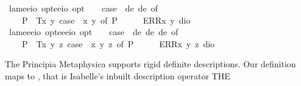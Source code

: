 \begin{isabellebody}
\isanewline
{}\isamarkupfalse%
\ lam{}{\isacharcolon}{\isacharcolon}{\isachardoublequoteopen}{\isacharparenleft}e{\isasymRightarrow}e{\isasymRightarrow}io\ opt{\isacharparenright}{\isasymRightarrow}{\isacharparenleft}e{\isasymRightarrow}e{\isasymRightarrow}io{\isacharparenright}\ opt{\isachardoublequoteclose}{\isacharparenleft}{\isachardoublequoteopen}\isactrlbold {\isasymlambda}\ \ {\isachardoublequoteopen}\isactrlbold {\isasymlambda}\ {\isasymequiv}\ case\ {\isacharparenleft}{\isasymPhi}\ de\ de{\isacharparenright}\ of\isanewline
\ \ \ \ P{\isacharparenleft}{\isasymphi}{\isacharparenright}\ {\isasymRightarrow}\ T{\isacharparenleft}{\isasymlambda}x\ y{\isachardot}\ case\ {\isacharparenleft}{\isasymPhi}\ x\ y{\isacharparenright}\ of\ P{\isacharparenleft}{\isasymphi}{\isacharparenright}\ {\isasymRightarrow}\ {\isasymphi}{\isacharparenright}\ {\isacharbar}\ {\isacharunderscore}\ {\isasymRightarrow}\ ERR{\isacharparenleft}{\isasymlambda}x\ y{\isachardot}\ dio{\isacharparenright}{\isachardoublequoteclose}\isanewline
\isanewline
{}\isamarkupfalse%
\ lam{}{\isacharcolon}{\isacharcolon}{\isachardoublequoteopen}{\isacharparenleft}e{\isasymRightarrow}e{\isasymRightarrow}e{\isasymRightarrow}io\ opt{\isacharparenright}{\isasymRightarrow}{\isacharparenleft}e{\isasymRightarrow}e{\isasymRightarrow}e{\isasymRightarrow}io{\isacharparenright}\ opt{\isachardoublequoteclose}{\isacharparenleft}{\isachardoublequoteopen}\isactrlbold {\isasymlambda}\ \ {\isachardoublequoteopen}\isactrlbold {\isasymlambda}\ {\isasymequiv}\ case\ {\isacharparenleft}{\isasymPhi}\ de\ de\ de{\isacharparenright}\ of\isanewline
\ \ \ \ P{\isacharparenleft}{\isasymphi}{\isacharparenright}\ {\isasymRightarrow}\ T{\isacharparenleft}{\isasymlambda}x\ y\ z{\isachardot}\ case\ {\isacharparenleft}{\isasymPhi}\ x\ y\ z{\isacharparenright}\ of\ P{\isacharparenleft}{\isasymphi}{\isacharparenright}\ {\isasymRightarrow}\ {\isasymphi}{\isacharparenright}\ {\isacharbar}\ {\isacharunderscore}\ {\isasymRightarrow}\ ERR{\isacharparenleft}{\isasymlambda}x\ y\ z{\isachardot}\ dio{\isacharparenright}{\isachardoublequoteclose}%
\begin{isamarkuptext}%
The Principia Metaphysica supports rigid definite descriptions. Our definition maps
  to , that is Isabelle's inbuilt description operator THE 

\end{isamarkuptext}
\end{isabellebody}

